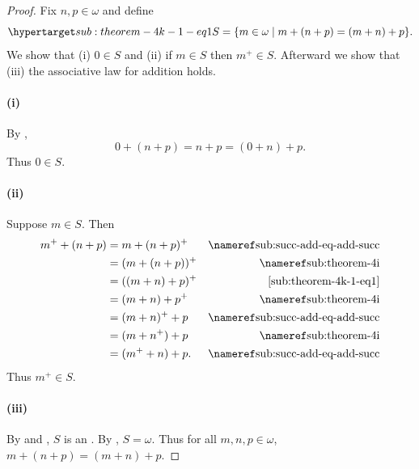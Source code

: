 \documentclass{report}
\begin{document}
\begin{proof}


  Fix $n, p \in \omega$ and define
    \begin{equation}
      \hyperlabel{sub:theorem-4k-1-eq1}
      S = \{m \in \omega \mid m + (n + p) = (m + n) + p\}.
    \end{equation}
  We show that (i) $0 \in S$ and (ii) if $m \in S$ then $m^+ \in S$.
  Afterward we show that (iii) the associative law for addition holds.

  \paragraph{(i)}%

    By ,
      $$0 + (n + p) = n + p = (0 + n) + p.$$
    Thus $0 \in S$.

  \paragraph{(ii)}%

    Suppose $m \in S$.
    Then
      \begin{align*}
        m^+ + (n + p)
          & = m + (n + p)^+ & \textref{sub:succ-add-eq-add-succ} \\
          & = (m + (n + p))^+ & \textref{sub:theorem-4i} \\
          & = ((m + n) + p)^+ & \eqref{sub:theorem-4k-1-eq1} \\
          & = (m + n) + p^+ & \textref{sub:theorem-4i} \\
          & = (m + n)^+ + p & \textref{sub:succ-add-eq-add-succ} \\
          & = (m + n^+) + p & \textref{sub:theorem-4i} \\
          & = (m^+ + n) + p. & \textref{sub:succ-add-eq-add-succ}
      \end{align*}
    Thus $m^+ \in S$.

  \paragraph{(iii)}%

    By  and , $S$ is an
      .
    By , $S = \omega$.
    Thus for all $m, n, p \in \omega$, $m + (n + p) = (m + n) + p$.

\end{proof}
\end{document}

